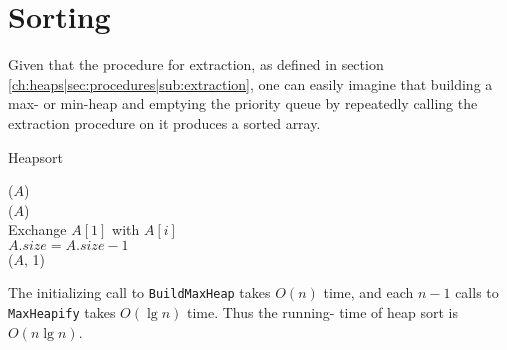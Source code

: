 \newpage
\section{Sorting}
Given that the procedure for extraction, as defined in section
\ref{ch:heaps|sec:procedures|sub:extraction}, one can easily imagine that
building a max- or min-heap and emptying the priority queue by repeatedly
calling the extraction procedure on it produces a sorted array.

\begin{algorithm}[H]
	\caption{Heapsort}
	\label{alg:heapsort}





	\BlankLine
	\HeapSort($A$) \\
	\Begin
	{
		\BuildMaxHeap($A$) \\
		{
			Exchange $A[1]$ with $A[i]$ \\
			$A.size = A.size - 1$ \\
			\MaxHeapify($A$, 1)
		}
	}
\end{algorithm}

The initializing call to \texttt{BuildMaxHeap} takes $O(n)$ time, and each
$n-1$ calls to \texttt{MaxHeapify} takes $O(\lg n)$ time. Thus the running-
time of heap sort is $O(n \lg n)$.

